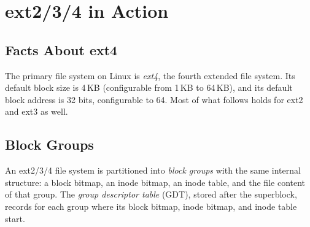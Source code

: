 \newcommand{\extdir}[8]{%
  \begin{scope}[shift={#2}]
    \pgfmathsetmacro{\extxb}{#5}\pgfmathsetmacro{\extxc}{#5+#6}\pgfmathsetmacro{\extxd}{#5+#6+#7}
    \node[font=\extfont\bfseries, anchor=south] at (\extxd/2,0.02) {#3};
    \node[extc, anchor=north west, fill=bootc, text=white, font=\extfont\bfseries, minimum width=#5cm, minimum height=\extrowh cm] at (0,0) {Inode \#};
    \node[extc, anchor=north west, fill=bootc, text=white, font=\extfont\bfseries, minimum width=#6cm, minimum height=\extrowh cm] at (\extxb,0) {#4};
    \node[extc, anchor=north west, fill=bootc, text=white, font=\extfont\bfseries, minimum width=#7cm, minimum height=\extrowh cm] at (\extxc,0) {Filename};
    \foreach \a/\b/\c [count=\i] in {#8} {
      \node[extc, anchor=north west, fill=rowc, font=\extfont, minimum width=#5cm, minimum height=\extrowh cm] (#1-n\i) at (0,-\extrowh*\i) {\a};
      \node[extc, anchor=north west, fill=rowc, font=\extfont, minimum width=#6cm, minimum height=\extrowh cm] (#1-m\i) at (\extxb,-\extrowh*\i) {\b};
      \node[extc, anchor=north west, fill=rowc, font=\extfont, minimum width=#7cm, minimum height=\extrowh cm] (#1-f\i) at (\extxc,-\extrowh*\i) {\c};
      \xdef\extn{\i}
    }
    \draw[thick] (0,0) rectangle (\extxd,{-\extrowh*(\extn+1)});
  \end{scope}}

\section{ext2/3/4 in Action}
\label{sec:ext}

\subsection{Facts About ext4}

The primary file system on Linux is \emph{ext4}, the fourth extended file system. Its default block size is 4\,KB (configurable from 1\,KB to 64\,KB), and its default block address is 32 bits, configurable to 64. Most of what follows holds for ext2 and ext3 as well.

\subsection{Block Groups}

\begin{definition}
  An ext2/3/4 file system is partitioned into \emph{block groups} with the same internal structure: a block bitmap, an inode bitmap, an inode table, and the file content of that group. The \emph{group descriptor table} (GDT), stored after the superblock, records for each group where its block bitmap, inode bitmap, and inode table start.
\end{definition}

